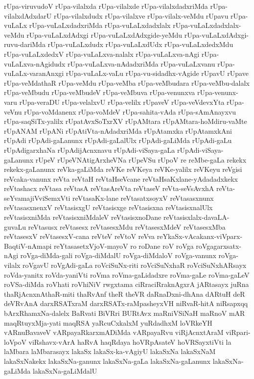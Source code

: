 {rUpa-viruvudoV
rUpa-vilalxda
rUpa-vilalxde
rUpa-vilalxdadxriMda
rUpa-vilalxdAdxdarU
rUpa-vilalxdudx
rUpa-vilalxve
rUpa-vilalx-veMdu
rUpavu
rUpa-vuLaLx
rUpa-vuLaLxdadxriMda
rUpa-vuLaLxdadxlalx
rUpa-vuLaLxdadxlalx-veMdu
rUpa-vuLaLxdAdxgi
rUpa-vuLaLxdAdxgide-yeMdu
rUpa-vuLaLxdAdxgi-ruvu-dariMda
rUpa-vuLaLxdudx
rUpa-vuLaLxdUdx
rUpa-vuLaLxdedxMdu
rUpa-vuLaLxdedxV
rUpa-vuLaLxva-nalalx
rUpa-vuLaLxva-nAgi
rUpa-vuLaLxva-nAgidudx
rUpa-vuLaLxva-nAdadxriMda
rUpa-vuLaLxvanu
rUpa-vuLaLx-varanAnxgi
rUpa-vuLaLx-vaLu
rUpa-vu-sidadhx-vAgide
rUpavU
rUpave
rUpa-veMdathaR
rUpa-veMdu
rUpa-veMba
rUpa-veMbudara
rUpa-veMbu-dalalx
rUpa-veMbudu
rUpa-veMbudeV
rUpa-veMbuva
rUpa-venunxva
rUpa-venunx-varu
rUpa-veraDU
rUpa-velalxvU
rUpa-velilx
rUpaveV
rUpa-veVdevxYta
rUpa-veVnu
rUpa-voMdanenx
rUpa-voMdeV
rUpa-sahita-vAda
rUpa-sAmAnayxvu
rUpa-saqSiTx-yalilx
rUpatAvxSoTxrXV
rUpAMtara
rUpAMtara-hoMdiru-vaMte
rUpANAM
rUpANi
rUpAtiVta-nAdadxriMda
rUpAtamxka
rUpAtamxkAni
rUpAdi
rUpAdi-gaLanunx
rUpAdi-gaLalUlx
rUpAdi-gaLiMda
rUpAdi-gaLu
rUpAdigarxhaNa
rUpAdijAcnxnavu
rUpAdi-viSaya-gaLa
rUpAdi-viSaya-gaLanunx
rUpeV
rUpeVNAtigArxheVNa
rUpeVSu
rUpoV
re
reMbe-gaLa
rekekx
rekekx-gaLanunx
reVka-gaLiMda
reVKe
reVKeya
reVKe-yalilx
reVKeyu
reVgisi
reVcaka-vanunx
reVta
reVtaH
reVtaHseVcane
reVtaHsaKxlane-yAdadadxkekx
reVtashacx
reVtasa
reVtasA
reVtasAreVta
reVtaseV
reVta-seVsAvxhA
reVta-seYvamajiVviSemxVti
reVtasaKx-lane
reVtasatxsoyxV
reVtasasxnunx
reVtasasxnenxV
reVtasisxgU
reVtasisxge
reVtasisxna
reVtasisxnalUlx
reVtasisxniMda
reVtasisxniMdaleV
reVtasisxnoDane
reVtasisxlalx-davaLA-guvaLu
reVtasusx
reVtasesx
reVtasesxMdu
reVtasesxMdeV
reVtasesxMba
reVtasesxV
reVtasesxV-cana
reVteV
reVtoV
reVva
reYkaSx-vAcakanx-viVparx-BaqtiV-nAmapi
reYtasasetxVjoV-mayoV
ro
roDane
roV
roVga
roVgagarxsatx-nAgi
roVga-diMda-gali
roVga-diMdalU
roVga-diMdaloV
roVga-vanunx
roVga-vilalx
roVgavU
roVgAdi-gaLa
roVciSuNx-riti
roVciSuNxhaR
roVciSuNxhARsayx
roVda-yanitx
roVda-yaniVti
roVma
roVma-gaLidadxre
roVma-gaLe
roVma-gaLeV
roVSa-diMda
roVhati
roVhiNiV
rwgxtama
ciRraciRraknAgxrA
jARtasayx
juRna
thaRjAcnxnAthaR-miti
thaRvAnf
theR
theVR
daRnaDxni-dhAna
dARtuH
deR
deVRvAnA
darxRSATxraM
darxRSATx-raMpasheyxVH
niRvaR-hitA
niRsapxqq
bArxRhamxNa-dalelx
BaRvati
BiVRri
BURtAvx
maRniVSiNaH
maRnoV
mAR
maqRtuyxMja-yati
maqRSA
yaRcuCxkalxM
yuRdadhxM
loVRkeYH
vARnuBavaveV
vARpayaRkarxmADiMda
vARpayaRvu
viRjAcnxtAraM
viRpari-loVpoV
viRshavx-vArA
haRvA
haqRdaya
hoVRpAsateV
hoVRSayxtiVti
la
laMbara
laMbarasayx
lakaSx
lakaSx-ka-vAgiyU
lakaSxNa
lakaSxNaM
lakaSxNakekx
lakaSxNa-ganunx
lakaSxNa-gaLa
lakaSxNa-gaLanunx
lakaSxNa-gaLiMda
lakaSxNa-gaLiMdalU
}
